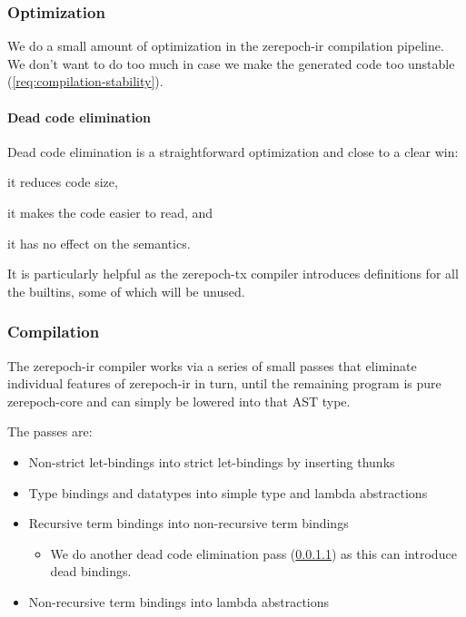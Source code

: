 \subsubsection{Optimization}

We do a small amount of optimization in the \gls{zerepoch-ir} compilation pipeline.
We don't want to do too much in case we make the generated code too unstable (\cref{req:compilation-stability}).

\paragraph{Dead code elimination}
\label{para:dead-code}

Dead code elimination is a straightforward optimization and close to a clear win:
\begin{inparaenum}
\item it reduces code size,
\item it makes the code easier to read, and
\item it has no effect on the semantics.
\end{inparaenum}

It is particularly helpful as the \gls{zerepoch-tx} compiler introduces definitions for all the builtins, some of which will be unused.

\subsubsection{Compilation}

The \gls{zerepoch-ir} compiler works via a series of small passes that eliminate individual features of \gls{zerepoch-ir} in turn, until the remaining program is pure \gls{zerepoch-core} and can simply be lowered into that AST type.

The passes are:
\begin{itemize}
\item Non-strict let-bindings into strict let-bindings by inserting thunks
\item Type bindings and datatypes into simple type and lambda abstractions
\item Recursive term bindings into non-recursive term bindings
  \begin{itemize}
  \item We do another dead code elimination pass (\cref{para:dead-code}) as this can introduce dead bindings.
  \end{itemize}
\item Non-recursive term bindings into lambda abstractions
\end{itemize}

